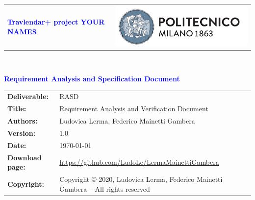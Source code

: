 


        \begin{titlepage}
                {\begin{table}[t!]
                \centering
                \begin{tabu} to \textwidth { X[1.3,r,p] X[1.7,l,p] }
                \textcolor{Blue}
                {\textbf{\small{Travlendar+ project YOUR NAMES}}} & \includegraphics[scale=0.5]{Images/PolimiLogo}
                \end{tabu}
                \end{table}}~\\ [7cm]

                \begin{flushleft}
                {\textcolor{Blue}{\textbf{\Huge{Requirement Analysis and Specification Document}}}} \\ [1cm]
                \end{flushleft}
        \end{titlepage}

        \begin{table}[h!]
                \begin{tabu} to \textwidth { X[0.3,r,p] X[0.7,l,p] }
                \hline
                
                \textbf{Deliverable:} & RASD\\
                \textbf{Title:} & Requirement Analysis and Verification Document \\
                \textbf{Authors:} & Ludovica Lerma, Federico Mainetti Gambera \\
                \textbf{Version:} & 1.0 \\ 
                \textbf{Date:} & \today \\
                \textbf{Download page:} & \url{https://github.com/LudoLe/LermaMainettiGambera}\\
                \textbf{Copyright:} & Copyright © 2020, Ludovica Lerma, Federico Mainetti Gambera – All rights reserved \\
                \hline
                \end{tabu}
        \end{table}

